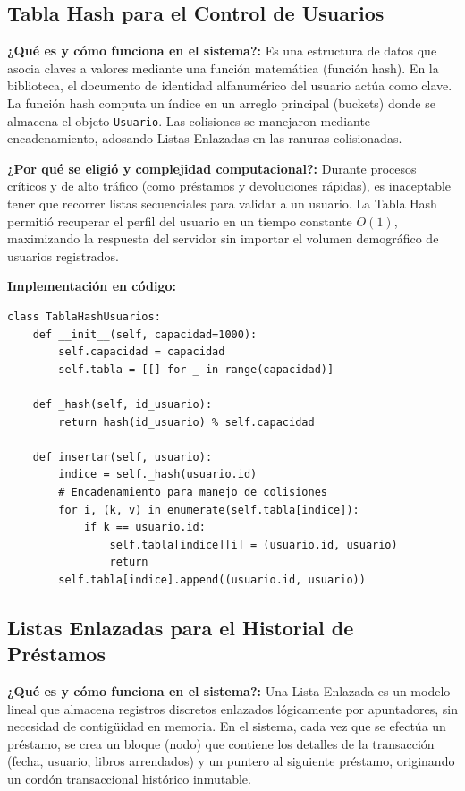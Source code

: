 \documentclass{rapport}
\begin{document}
\subsection{Tabla Hash para el Control de Usuarios}
\textbf{¿Qué es y cómo funciona en el sistema?:} Es una estructura de datos que asocia claves a valores mediante una función matemática (función hash). En la biblioteca, el documento de identidad alfanumérico del usuario actúa como clave. La función hash computa un índice en un arreglo principal (buckets) donde se almacena el objeto \texttt{Usuario}. Las colisiones se manejaron mediante encadenamiento, adosando Listas Enlazadas en las ranuras colisionadas.

\textbf{¿Por qué se eligió y complejidad computacional?:} Durante procesos críticos y de alto tráfico (como préstamos y devoluciones rápidas), es inaceptable tener que recorrer listas secuenciales para validar a un usuario. La Tabla Hash permitió recuperar el perfil del usuario en un tiempo constante $O(1)$, maximizando la respuesta del servidor sin importar el volumen demográfico de usuarios registrados.

\textbf{Implementación en código:}
\begin{verbatim}
class TablaHashUsuarios:
    def __init__(self, capacidad=1000):
        self.capacidad = capacidad
        self.tabla = [[] for _ in range(capacidad)]
        
    def _hash(self, id_usuario):
        return hash(id_usuario) % self.capacidad
        
    def insertar(self, usuario):
        indice = self._hash(usuario.id)
        # Encadenamiento para manejo de colisiones
        for i, (k, v) in enumerate(self.tabla[indice]):
            if k == usuario.id:
                self.tabla[indice][i] = (usuario.id, usuario)
                return
        self.tabla[indice].append((usuario.id, usuario))
\end{verbatim}

\subsection{Listas Enlazadas para el Historial de Préstamos}
\textbf{¿Qué es y cómo funciona en el sistema?:} Una Lista Enlazada es un modelo lineal que almacena registros discretos enlazados lógicamente por apuntadores, sin necesidad de contigüidad en memoria. En el sistema, cada vez que se efectúa un préstamo, se crea un bloque (nodo) que contiene los detalles de la transacción (fecha, usuario, libros arrendados) y un puntero al siguiente préstamo, originando un cordón transaccional histórico inmutable.
\end{document}
